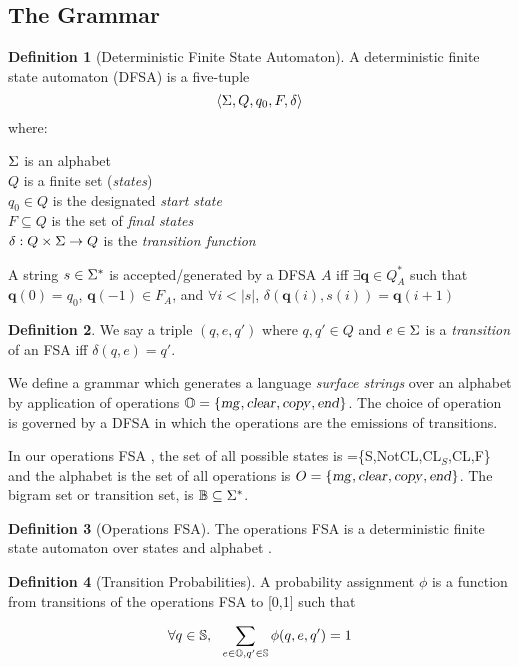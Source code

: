 \documentclass[12pt]{article}
\theoremstyle{definition}
\newtheorem{definition}{Definition}[section]
\begin{document}
\subsection{The Grammar}
\label{sec:grammar}



\begin{definition}[Deterministic Finite State Automaton]
  A deterministic finite state automaton (DFSA) is a five-tuple 
\[\langle \Sigma, Q, q_0, F, \delta  \rangle  \]
where:

\noindent $\Sigma$ is an alphabet\\
$Q$ is a finite set (\textit{states})\\
$q_0\in Q$ is the designated \textit{start state}\\
$F\subseteq Q$ is the set of \textit{final states}\\
$\delta: Q\times \Sigma \rightarrow Q$ is the \textit{transition function} 

A string $s\in\Sigma^*$ is accepted/generated by a DFSA $A$ iff
$\exists \mathbf{q} \in Q_A^*$ such that $\mathbf{q}(0)=q_0$, $\mathbf{q}(-1)\in F_A$, and $\forall i<|s|$, $\delta(\mathbf{q}(i),s(i))=\mathbf{q}(i+1)$
\label{def:dfsa}
\end{definition}

\begin{definition}
  We say a triple $(q,e,q')$ where $q,q'\in Q$ and $e\in\Sigma$ is a \textit{transition} of an
  FSA iff $\delta(q,e)=q'$.
\end{definition}

We define a grammar which generates a language \textit{surface strings} over an alphabet \sg by application of operations $\mathbb{O}=\{\text{\textsl{mg}},\text{\textsl{clear}},\text{\textsl{copy}},\text{\textsl{end}}\}$. The choice of operation is governed by a DFSA in which the operations are the emissions of transitions.

In our operations FSA \OPS, the set of all possible states is \STATES=\{S,NotCL,CL$_S$,CL,F\} and the alphabet is the set of all operations is $O=\{\text{\textsl{mg}},\text{\textsl{clear}},\text{\textsl{copy}},\text{\textsl{end}}\}$. The bigram set or transition set, is $\mathbb{B}\subseteq\Sigma^*$.


\begin{definition}[Operations FSA]
  The operations FSA is a deterministic finite state automaton over states \STATES and alphabet \OPS.
\end{definition}

\begin{definition}[Transition Probabilities]
   
  A probability assignment $\phi$ is a function from transitions of the operations FSA to [0,1] such that

$$\forall q\in \mathbb{S},~~\sum_{e\in\mathbb{O},q'\in \mathbb{S}} \phi(q,e,q') = 1 $$

\end{definition}
\end{document}
